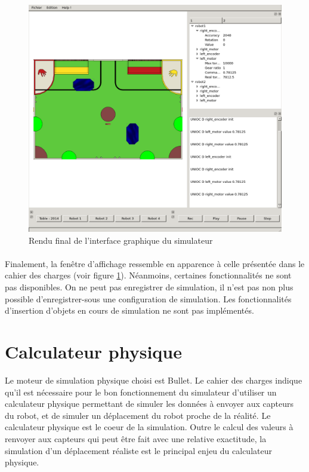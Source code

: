 \begin{figure}[!h]
\includegraphics[width=\textwidth]{captureui.png}
\caption{Rendu final de l'interface graphique du simulateur}
\label{captureui}
\end{figure}
\clearpage

\paragraph{}
Finalement, la fenêtre d'affichage ressemble en apparence à celle présentée dans le cahier des charges (voir figure \ref{captureui}). Néanmoins, certaines fonctionnalités ne sont pas disponibles. On ne peut pas enregistrer de simulation, il n'est pas non plus possible d'enregistrer-sous une configuration de simulation. Les fonctionnalités d'insertion d'objets en cours de simulation ne sont pas implémentés.

\section{Calculateur physique}

Le moteur de simulation physique choisi est Bullet. Le cahier des charges indique qu'il est nécessaire pour le bon fonctionnement du simulateur d'utiliser un calculateur physique permettant de simuler les données à envoyer aux capteurs du robot, et de simuler un déplacement du robot proche de la réalité. Le calculateur physique est le coeur de la simulation. Outre le calcul des valeurs à renvoyer aux capteurs qui peut être fait avec une relative exactitude, la simulation d'un déplacement réaliste est le principal enjeu du calculateur physique.

